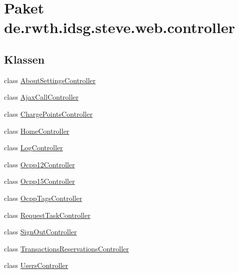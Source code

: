 \hypertarget{namespacede_1_1rwth_1_1idsg_1_1steve_1_1web_1_1controller}{\section{Paket de.\-rwth.\-idsg.\-steve.\-web.\-controller}
\label{namespacede_1_1rwth_1_1idsg_1_1steve_1_1web_1_1controller}
}
\subsection*{Klassen}
\begin{DoxyCompactItemize}
\item 
class \hyperlink{classde_1_1rwth_1_1idsg_1_1steve_1_1web_1_1controller_1_1_about_settings_controller}{About\-Settings\-Controller}
\item 
class \hyperlink{classde_1_1rwth_1_1idsg_1_1steve_1_1web_1_1controller_1_1_ajax_call_controller}{Ajax\-Call\-Controller}
\item 
class \hyperlink{classde_1_1rwth_1_1idsg_1_1steve_1_1web_1_1controller_1_1_charge_points_controller}{Charge\-Points\-Controller}
\item 
class \hyperlink{classde_1_1rwth_1_1idsg_1_1steve_1_1web_1_1controller_1_1_home_controller}{Home\-Controller}
\item 
class \hyperlink{classde_1_1rwth_1_1idsg_1_1steve_1_1web_1_1controller_1_1_log_controller}{Log\-Controller}
\item 
class \hyperlink{classde_1_1rwth_1_1idsg_1_1steve_1_1web_1_1controller_1_1_ocpp12_controller}{Ocpp12\-Controller}
\item 
class \hyperlink{classde_1_1rwth_1_1idsg_1_1steve_1_1web_1_1controller_1_1_ocpp15_controller}{Ocpp15\-Controller}
\item 
class \hyperlink{classde_1_1rwth_1_1idsg_1_1steve_1_1web_1_1controller_1_1_ocpp_tags_controller}{Ocpp\-Tags\-Controller}
\item 
class \hyperlink{classde_1_1rwth_1_1idsg_1_1steve_1_1web_1_1controller_1_1_request_task_controller}{Request\-Task\-Controller}
\item 
class \hyperlink{classde_1_1rwth_1_1idsg_1_1steve_1_1web_1_1controller_1_1_sign_out_controller}{Sign\-Out\-Controller}
\item 
class \hyperlink{classde_1_1rwth_1_1idsg_1_1steve_1_1web_1_1controller_1_1_transactions_reservations_controller}{Transactions\-Reservations\-Controller}
\item 
class \hyperlink{classde_1_1rwth_1_1idsg_1_1steve_1_1web_1_1controller_1_1_users_controller}{Users\-Controller}
\end{DoxyCompactItemize}
